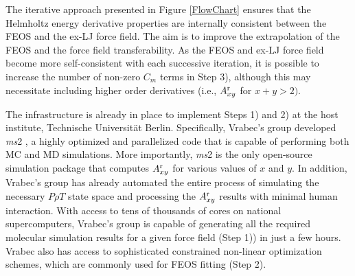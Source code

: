\documentclass[12pt,a4paper]{article}
\begin{document}

The iterative approach presented in Figure \ref{FlowChart} ensures that the Helmholtz energy derivative properties are internally consistent between the FEOS and the ex-LJ force field. The aim is to improve the extrapolation of the FEOS and the force field transferability. As the FEOS and ex-LJ force field become more self-consistent with each successive iteration, it is possible to increase the number of non-zero $C_m$ terms in Step 3), although this may necessitate including higher order derivatives (i.e., $A_{xy}^{\rm r}$ for $x+y>2)$.

The infrastructure is already in place to implement Steps 1) and 2) at the host institute, Technische Universit\"{a}t Berlin. Specifically, Vrabec's group developed \textit{ms}2 \cite{ms2}, a highly optimized and parallelized code that is capable of performing both MC and MD simulations. More importantly, \textit{ms}2 is the only open-source simulation package that computes $A_{xy}^{\rm r}$ for various values of $x$ and $y$. In addition, Vrabec's group has already automated the entire process of simulating the necessary $P \rho T$ state space and processing the $A_{xy}^{\rm r}$ results with minimal human interaction. With access to tens of thousands of cores on national supercomputers, Vrabec's group is capable of generating all the required molecular simulation results for a given force field (Step 1)) in just a few hours. Vrabec also has access to sophisticated constrained non-linear optimization schemes, which are commonly used for FEOS fitting (Step 2). 
\end{document}
